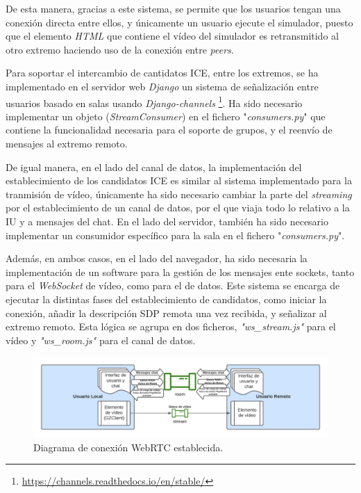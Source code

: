 \documentclass[a4paper, 12pt]{book}
\begin{document}
De esta manera, gracias a este sistema, se permite que los usuarios tengan una conexión directa entre ellos, y únicamente un usuario ejecute el simulador, puesto que el elemento \emph{HTML} que contiene el vídeo del simulador es retransmitido al otro extremo haciendo uso de la conexión entre \emph{peers}.

Para soportar el intercambio de cantidatos ICE, entre los extremos, se ha implementado en el servidor web \emph{Django} un sistema de señalización entre usuarios basado en salas usando \emph{Django-channels} \footnote{\url{https://channels.readthedocs.io/en/stable/}}. Ha sido necesario implementar un objeto (\emph{StreamConsumer}) en el fichero "\emph{consumers.py}" que contiene la funcionalidad necesaria para el soporte de grupos, y el reenvío de mensajes al extremo remoto.

De igual manera, en el lado del canal de datos, la implementación del establecimiento de los candidatos ICE es similar al sistema implementado para la tranmisión de vídeo, únicamente ha sido necesario cambiar la parte del \emph{streaming} por el establecimiento de un canal de datos, por el que viaja todo lo relativo a la IU y a mensajes del chat. En el lado del servidor, también ha sido necesario implementar un consumidor específico para la sala en el fichero "\emph{consumers.py}".

Además, en ambos casos, en el lado del navegador, ha sido necesaria la implementación de un software para la gestión de los mensajes ente sockets, tanto para el \emph{WebSocket} de vídeo, como para el de datos. Este sistema se encarga de ejecutar la distintas fases del establecimiento de candidatos, como iniciar la conexión, añadir la descripción SDP remota una vez recibida, y señalizar al extremo remoto. Esta lógica se agrupa en dos ficheros, \emph{"ws\_stream.js"} para el vídeo y \emph{"ws\_room.js"} para el canal de datos.

\begin{figure}[H]
	\centering
    \includegraphics[width=15cm]{img/diagrama_conexion_webrtc.png}
    \caption{Diagrama de conexión WebRTC establecida.}
    \label{figura:diagrama_conexion_webrtc}
\end{figure}
\end{document}
